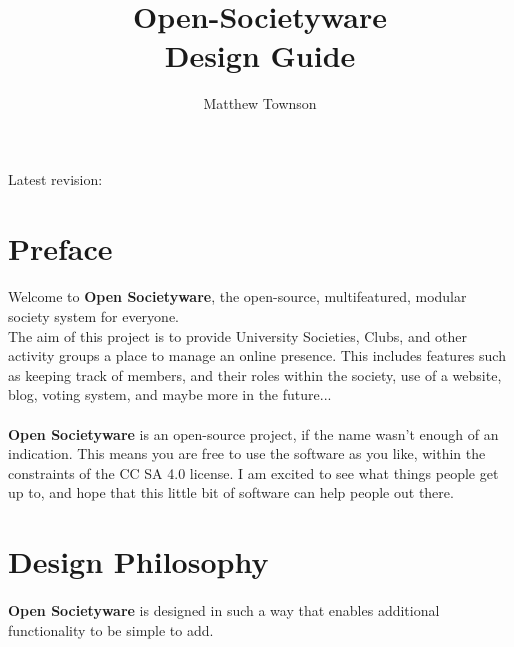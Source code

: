 \documentclass{report}
\title{Open-Societyware \\
       Design Guide}
\author{Matthew Townson}
\begin{document}
    \begin{titlepage}
        \centering
        \vspace*{1in}
        {\Huge\bfseries\thetitle \par}
        \vspace{1.5in}
        {\Large\theauthor \par}
        \vfill
        {\large Latest revision: \DTMtoday \par}
    \end{titlepage}

    \newpage
    \tableofcontents
    \newpage

    \renewcommand\thesection{\arabic{section}.0}
    \renewcommand\thesubsection{\arabic{section}.\arabic{subsection}}
    \setcounter{section}{-1}

    \raggedright

    \section{Preface}
    \paragraph*{}
        Welcome to \textbf{Open Societyware}, the open-source, multifeatured, modular society system for everyone. \\
        The aim of this project is to provide University Societies, Clubs, and other activity groups a place to manage
        an online presence. This includes features such as keeping track of members, and their roles within the society,
        use of a website, blog, voting system, and maybe more in the future...
    
    \paragraph*{}
        \textbf{Open Societyware} is an open-source project, if the name wasn't enough of an indication. This means
        you are free to use the software as you like, within the constraints of the CC SA 4.0 license. I am excited to
        see what things people get up to, and hope that this little bit of software can help people out there.

    \newpage
    \section{Design Philosophy}
    \paragraph*{}
        \textbf{Open Societyware} is designed in such a way that enables additional functionality to be simple to add.
\end{document}
